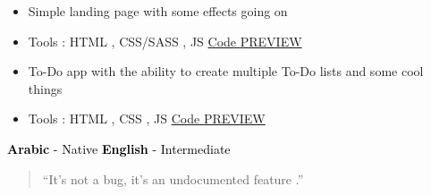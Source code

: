 \documentclass[10pt,a4paper,ragged2e,withhyper]{altacv}
\begin{document}
\begin{paracol}{2}
\begin{itemize}
\end{itemize}
\divider
{}
\begin{itemize}
\item[\ding{32}] Simple landing page with some effects going on
\vspace{0.1cm}
\item[\ding{32}] Tools : HTML , CSS/SASS , JS
\vspace{0.2cm}
\newline
\href{https://github.com/iknevo/natours}{\faCode \hspace{0.01cm} Code }
\hspace{0.1cm}
\href{https://nevo-natours.netlify.app/}{\faGlobe \hspace{0.01cm} PREVIEW}



\end{itemize}

\divider

\begin{itemize}
\item[\ding{32}] To-Do app with the ability to create multiple To-Do lists and some cool things
\vspace{0.1cm}
\item[\ding{32}] Tools : HTML , CSS , JS
\vspace{0.2cm}
\newline
\href{https://github.com/iknevo/to-do-app}{\faCode \hspace{0.01cm} Code }
\hspace{0.1cm}
\href{https://nevo-todo.netlify.app/}{\faGlobe \hspace{0.01cm} PREVIEW}



\end{itemize}
\vspace{0.3cm}



\textcolor{black}{\textbf{Arabic} - Native}
\newline \vspace{0.1cm}
\textcolor{black}{\textbf{English} - Intermediate}
\vspace{0.3cm}

\begin{quote}
``It’s not a bug, it’s an undocumented feature .''
\end{quote}

\switchcolumn
{}


\end{paracol}
\end{document}
